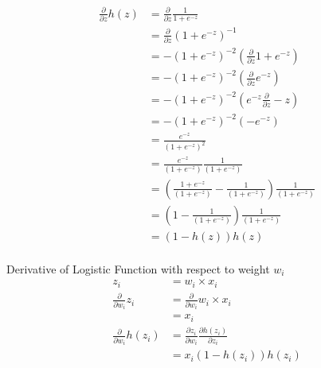 \begin{align*}
    \frac{\partial}{\partial z} h(z) &= \frac{\partial}{\partial z} \frac{1}{1+e^{-z}} \\
    &= \frac{\partial}{\partial z} (1 + e^{-z})^{-1} \\
    &= -(1 + e^{-z})^{-2} \left(\frac{\partial}{\partial z} 1 + e^{-z}\right) \\
    &= -(1 + e^{-z})^{-2} \left(\frac{\partial}{\partial z} e^{-z}\right) \\
    &= -(1 + e^{-z})^{-2} \left(e^{-z} \frac{\partial}{\partial z} -z\right) \\
    &= -(1 + e^{-z})^{-2} (-e^{-z})\\
    &= \frac{e^{-z}}{(1+e^{-z})^2} \\
    &= \frac{e^{-z}}{(1+e^{-z})}\frac{1}{(1 + e^{-z})}\\
    &= \left(\frac{1+e^{-z}}{(1+e^{-z})} - \frac{1}{(1+e^{-z})}\right)\frac{1}{(1 + e^{-z})}\\
    &= \left(1 - \frac{1}{(1+e^{-z})}\right)\frac{1}{(1 + e^{-z})}\\
    &= (1-h(z))h(z)\\
\end{align*}

Derivative of Logistic Function with respect to weight $w_i$\\
\begin{align*}
    z_i &= w_i \times x_i \\
    \frac{\partial}{\partial w_i} z_i &= \frac{\partial}{\partial w_i} w_i \times x_i\\
    &= x_i\\
    \frac{\partial}{\partial w_i} h(z_i) &= \frac{\partial z_i}{\partial w_i}\frac{\partial h(z_i)}{\partial z_i} \\
    &= x_i (1 - h(z_i)) h(z_i)\\
\end{align*}


